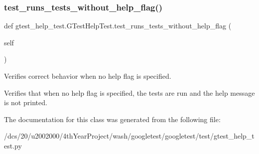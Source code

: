 \subsubsection{\texorpdfstring{test\+\_\+runs\+\_\+tests\+\_\+without\+\_\+help\+\_\+flag()}{test\_runs\_tests\_without\_help\_flag()}}
{\footnotesize\ttfamily def gtest\+\_\+help\+\_\+test.\+G\+Test\+Help\+Test.\+test\+\_\+runs\+\_\+tests\+\_\+without\+\_\+help\+\_\+flag (\begin{DoxyParamCaption}\item[{}]{self }\end{DoxyParamCaption})}

\begin{DoxyVerb}Verifies correct behavior when no help flag is specified.

Verifies that when no help flag is specified, the tests are run
and the help message is not printed.
\end{DoxyVerb}
 

The documentation for this class was generated from the following file\+:\begin{DoxyCompactItemize}
\item 
/dcs/20/u2002000/4th\+Year\+Project/wash/googletest/googletest/test/gtest\+\_\+help\+\_\+test.\+py\end{DoxyCompactItemize}
